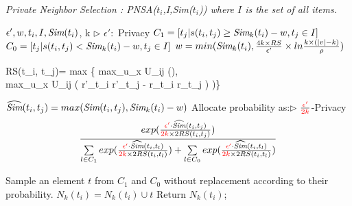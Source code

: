 \begin{algorithm}[!htb]
\caption{\small\itshape Private Neighbor Selection : PNSA($t_i$,I,\emph{Sim}($t_i$)) where $I$ is the set of all items.}
\label{Algo:pnsa}
\begin{algorithmic}[1]
\Require $\epsilon', w, t_i, I, \emph{Sim}(t_i)$, k		\hfill $\rhd$ $\epsilon':$ Privacy 
    \State $C_1 = \lbrack t_j | s(t_i, t_j) \geq \emph{Sim}_k(t_i)-w, t_j \in I\rbrack$
    \State $C_0 = \lbrack t_j | s(t_i, t_j) < \emph{Sim}_k(t_i)-w, t_j \in I\rbrack$
    \State $w=min(\emph{Sim}_k(t_i), \frac{4k \times RS}{\epsilon'} \times ln\frac{k \times (|v| - k)}{\rho})$
    \State \vspace{-6mm} {\small
        \begin{flalign*}
        RS(t_i, t_j)= max \{
        max_{u_x \in U_{ij}} (),\\ 
        max_{u_x \in U_{ij}} ( {\parallel r'_{t_i} \parallel \times \parallel r'_{t_j} \parallel} -  {\parallel r_{t_i} \parallel \times \parallel r_{t_j} \parallel)}
        )\}
        \end{flalign*}}\vspace{-4mm}
    \State $\widehat{\emph{Sim}}(t_i, t_j) = max(\emph{Sim}(t_i, t_j), \emph{Sim}_k(t_i) - w)$
    \State Allocate probability as:\hfill $\rhd$ $\frac{\color{red}\epsilon'}{\color{red}2k}$-Privacy
    \vspace{-3mm}
    $$
    \frac{exp(\frac{{\color{red} \epsilon'} \cdot \widehat{\emph{Sim}}(t_i, t_j)}{{\color{red} 2k} \times 2RS(t_i, t_j)})}{\sum \limits_{l \in C_1} exp(\frac{ {\color{red} \epsilon'} \cdot \widehat{\emph{Sim}}(t_i, t_l)}{{\color{red} 2k} \times 2RS(t_i, t_l)}) +  \sum \limits_{l \in C_0} exp(\frac{{\color{red} \epsilon'} \cdot \widehat{\emph{Sim}}(t_i, t_l)}{{\color{red} 2k} \times 2RS(t_i, t_l)})}
	$$
    \vspace{-4mm}
	\EndFor 

	\State Sample an element $t$ from $C_1$ and $C_0$ without replacement according to their probability.
	\State $N_k(t_i)=N_k(t_i) \cup t$
	\EndFor
	\State Return $N_k(t_i)$; 
\end{algorithmic}
\end{algorithm}


